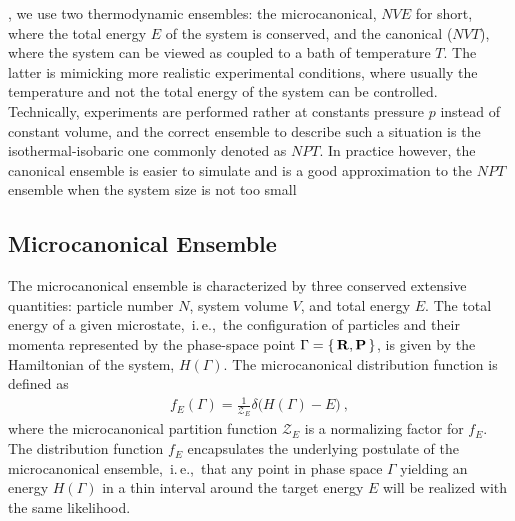 , we use two thermodynamic ensembles: the microcanonical, $NVE$ for short, where the total energy $E$ of the system is conserved, and the canonical ($NVT$), where the system can be viewed as coupled to a bath of temperature $T$. The latter is mimicking more realistic experimental conditions, where usually the temperature and not the total energy of the system can be controlled. Technically, experiments are performed rather at constants pressure $p$ instead of constant volume, and the correct ensemble to describe such a situation is the isothermal-isobaric one commonly denoted as $NPT$. In practice however, the canonical ensemble is easier to simulate and is a good approximation to the $NPT$ ensemble when the system size is not too small~\cite[p.\,134]{Tuckerman}


\subsection{Microcanonical Ensemble}
The microcanonical ensemble is characterized by three conserved extensive quantities: particle number $N$, system volume $V$, and total energy $E$. The total energy of a given microstate,~i.\,e.,~the configuration of particles and their momenta represented by the phase-space point $\Gamma = \set{{\bf R}, {\bf P}}$, is given by the Hamiltonian of the system, $H (\Gamma)$. 
The microcanonical distribution function is defined as
\begin{align}
f_E (\Gamma) = \frac{1}{\mathcal{Z}_E} \delta {\bm (} H (\Gamma) - E {\bm )}~,
\end{align}
where the microcanonical partition function $\mathcal{Z}_E$ is a normalizing factor for $f_E$. The distribution function $f_E$ encapsulates the underlying postulate of the microcanonical ensemble,~i.\,e.,~that any point in phase space $\Gamma$ yielding an energy $H (\Gamma)$ in a thin interval around the target energy $E$ 
will be realized with the same likelihood.

